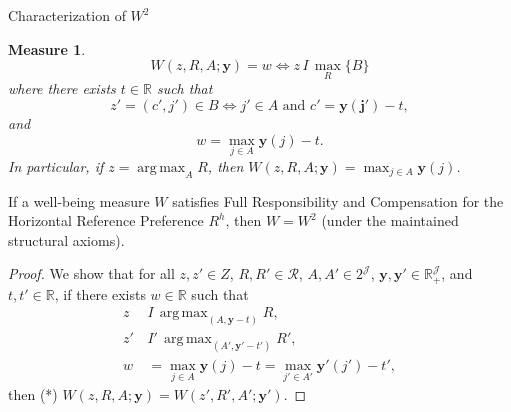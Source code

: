 \documentclass[10pt]{beamer}
\DeclareMathOperator*{\argmax}{arg\,max}
\newtheorem{Measure}{Measure}
\begin{document}
\begin{frame}[allowframebreaks]{Characterization of $W^2$}
\hypertarget{char:w2}{}%
\hyperlink{tab:classification}{}
\begin{Measure}
    \begin{equation*}
\label{ }
W(z, R, A;\mathbf{y})=w\Leftrightarrow z\,I\,\max_R\{B\}
\end{equation*}
where there exists $t\in\mathbb{R}$ such that 
\begin{equation*}
\label{ }
z'=(c',j')\in B\Leftrightarrow j'\in A \textrm{ and } c'=\mathbf{y(j')}-t,
\end{equation*}
and 
\begin{equation*}
\label{ }
w=\max_{j\in A}\mathbf{y}(j)-t.
\end{equation*}
In particular, if $z=\argmax_A R$, then $W(z, R, A;\mathbf{y})=\max_{j\in A}\mathbf{y}(j)$.

\end{Measure}
\scriptsize
\begin{theorem}
If a well-being measure $W$ satisfies Full Responsibility and Compensation for
the Horizontal Reference Preference $R^h$, then $W=W^2$ (under the maintained structural axioms).
\end{theorem}
\framebreak
\begin{proof}
We show that for all $z,z'\in Z$, $R,R'\in\mathcal R$, $A,A'\in 2^{\mathcal J}$,
$\mathbf y,\mathbf y'\in\mathbb R_+^{\mathcal J}$, and $t,t'\in\mathbb R$, if
there exists $w\in\mathbb R$ such that
\begin{align*}
z\,&I\,\argmax_{(A,\mathbf y-t)}R,\\
z'\,&I'\,\argmax_{(A',\mathbf y'-t')}R',\\
w&=\max_{j\in A}\mathbf y(j)-t=\max_{j'\in A'}\mathbf y'(j')-t',\end{align*}
then (*) $W(z,R,A;\mathbf y)=W(z',R',A';\mathbf y')$.


\end{proof}
\end{frame}
\end{document}
